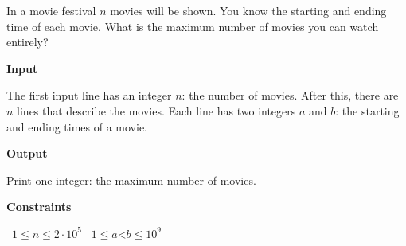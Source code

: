 In a movie festival $n$ movies will be shown. You know the starting and ending time of each movie. What is the maximum number of movies you can watch entirely?

\vspace{0.3cm}\noindent\textbf{Input}

The first input line has an integer $n$: the number of movies.
After this, there are $n$ lines that describe the movies. Each line has two integers $a$ and $b$: the starting and ending times of a movie.

\vspace{0.3cm}\noindent\textbf{Output}

Print one integer: the maximum number of movies.

\vspace{0.3cm}\noindent\textbf{Constraints}

\textbullet\ $1 \le n \le 2 \cdot 10^5$
\textbullet\ $1 \le a $<$ b \le 10^9$